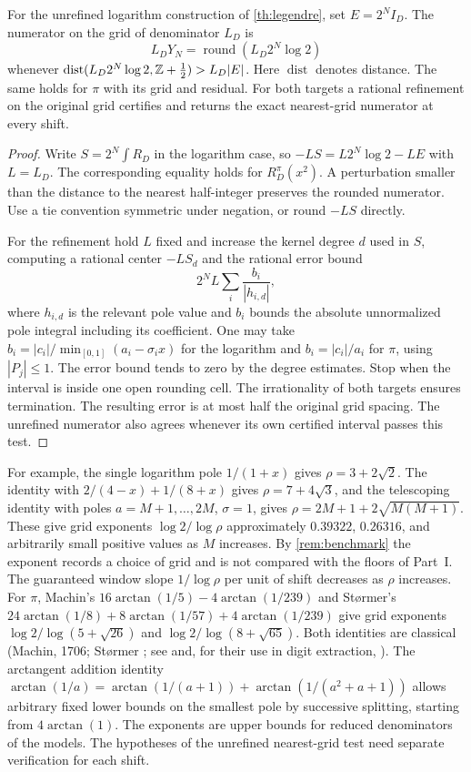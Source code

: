 \documentclass[11pt]{article}
\DeclareMathOperator{\round}{round}
\DeclareMathOperator{\dist}{dist}
\begin{document}
\begin{proposition}\label{prop:grid}
For the unrefined logarithm construction of \cref{th:legendre}, set $E=2^NI_D$. The numerator on the grid of denominator $L_D$ is
\[
 L_DY_N=\round(L_D2^N\log 2)
\]
whenever $\dist(L_D2^N\log 2,\Z+\tfrac12)>L_D|E|$. Here $\dist$ denotes distance. The same holds for $\pi$ with its grid and residual. For both targets a rational refinement on the original grid certifies and returns the exact nearest-grid numerator at every shift.
\end{proposition}
\begin{proof}
Write $S=2^N\int R_D$ in the logarithm case, so $-LS=L2^N\log 2-LE$ with $L=L_D$. The corresponding equality holds for $R_D^\pi(x^2)$. A perturbation smaller than the distance to the nearest half-integer preserves the rounded numerator. Use a tie convention symmetric under negation, or round $-LS$ directly.

For the refinement hold $L$ fixed and increase the kernel degree $d$ used in $S$, computing a rational center $-LS_d$ and the rational error bound
\[
 2^N L\sum_i \frac{b_i}{|h_{i,d}|},
\]
where $h_{i,d}$ is the relevant pole value and $b_i$ bounds the absolute unnormalized pole integral including its coefficient. One may take $b_i=|c_i|/\min_{[0,1]}(a_i-\sigma_i x)$ for the logarithm and $b_i=|c_i|/a_i$ for $\pi$, using $|P_j|\le1$. The error bound tends to zero by the degree estimates. Stop when the interval is inside one open rounding cell. The irrationality of both targets \cite{alladi,hata} ensures termination. The resulting error is at most half the original grid spacing. The unrefined numerator also agrees whenever its own certified interval passes this test.
\end{proof}

For example, the single logarithm pole $1/(1+x)$ gives $\rho=3+2\sqrt2$. The identity with $2/(4-x)+1/(8+x)$ gives $\rho=7+4\sqrt3$, and the telescoping identity with poles $a=M+1,\ldots,2M$, $\sigma=1$, gives $\rho=2M+1+2\sqrt{M(M+1)}$. These give grid exponents $\log2/\log\rho$ approximately $0.39322$, $0.26316$, and arbitrarily small positive values as $M$ increases. By \cref{rem:benchmark} the exponent records a choice of grid and is not compared with the floors of Part~I. The guaranteed window slope $1/\log\rho$ per unit of shift decreases as $\rho$ increases.
For $\pi$, Machin's $16\arctan(1/5)-4\arctan(1/239)$ and St{\o}rmer's $24\arctan(1/8)+8\arctan(1/57)+4\arctan(1/239)$ give grid exponents $\log 2/\log(5+\sqrt{26})$ and $\log 2/\log(8+\sqrt{65})$. Both identities are classical (Machin, 1706; St{\o}rmer \cite{storm}; see \cite[\S2.1]{bbg} and, for their use in digit extraction, \cite{taka}). The arctangent addition identity $\arctan(1/a)=\arctan(1/(a+1))+\arctan(1/(a^2+a+1))$ allows arbitrary fixed lower bounds on the smallest pole by successive splitting, starting from $4\arctan(1)$. The exponents are upper bounds for reduced denominators of the models. The hypotheses of the unrefined nearest-grid test need separate verification for each shift.
\end{document}
